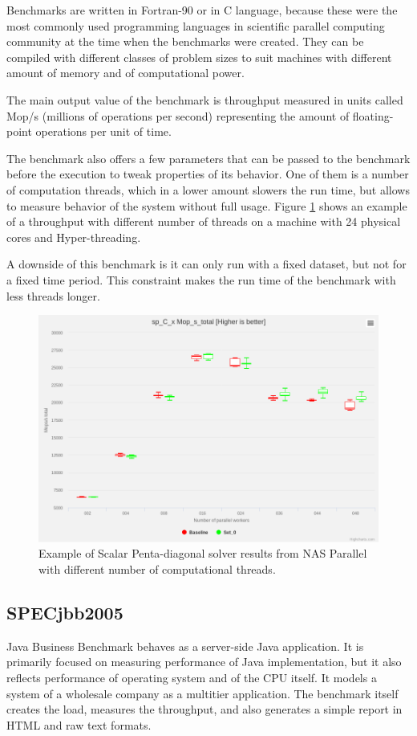 Benchmarks are written in Fortran-90 or in C language, because these were the most
commonly used programming languages in scientific parallel computing community
at the time when the benchmarks were created. They can be compiled with different classes of
problem sizes to suit machines with different amount of memory and of computational
power.

The main output value of the benchmark is throughput measured in units called Mop/s
(millions of operations per second) representing the amount of floating-point
operations per unit of time.

The benchmark also offers a few parameters that can be passed to the benchmark
before the execution to tweak properties of its behavior. One of them is a number of
computation threads, which in a lower amount slowers the run time, but allows to
measure behavior of the system without full usage. Figure \ref{fig:nas} shows
an example of a throughput with different number of threads on a machine with 24 physical cores
and Hyper-threading.

A downside of this benchmark is it can only run with a fixed dataset, but not for a
fixed time period. This constraint makes the run time of the benchmark with less
threads longer.

\begin{figure}
  \centering
  \includegraphics[width=12cm]{obrazky-figures/nas}
  \caption{Example of Scalar Penta-diagonal solver results from NAS Parallel with
    different number of computational threads.}
  \label{fig:nas}
\end{figure}

\subsection{SPECjbb2005}
Java Business Benchmark behaves as a server-side Java application. It is
primarily focused on measuring performance of Java implementation, but it also
reflects performance of operating system and of the CPU itself.
It models a system of a wholesale company as a multitier application. The benchmark
itself creates the load, measures the throughput, and also generates a simple
report in HTML and raw text formats.


